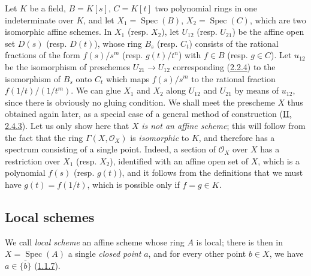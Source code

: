 \begin{example}[2.3.2]
\label{I.2.3.2}
Let $K$ be a field, $B=K[s]$, $C=K[t]$ two polynomial rings in one
indeterminate over $K$, and let $X_1=\operatorname{Spec}(B)$,
$X_2=\operatorname{Spec}(C)$, which are two isomorphic affine schemes. In
$X_1$ (resp. $X_2$), let $U_{12}$ (resp. $U_{21}$) be the affine open set
$D(s)$ (resp. $D(t)$), whose ring $B_s$ (resp. $C_t$) consists of the
rational fractions of the form $f(s)/s^m$ (resp. $g(t)/t^n$) with $f\in B$
(resp. $g\in C$). Let $u_{12}$ be the isomorphism of preschemes
$U_{21}\to U_{12}$ corresponding (\hyperref[I.2.2.4]{2.2.4}) to
the isomorphism of $B_s$ onto $C_t$ which maps $f(s)/s^m$ to the rational
fraction $f(1/t)/(1/t^m)$. We can glue $X_1$ and $X_2$ along
$U_{12}$ and $U_{21}$ by means of $u_{12}$, since there is obviously no
gluing condition. We shall meet the prescheme $X$ thus obtained again later,
as a special case of a general method of construction
(\hyperref[II.2.4.3]{II, 2.4.3}). Let us only show here that $X$
\emph{is not an affine scheme}; this will follow from the fact that the ring
$\Gamma(X,\mathscr{O}_X)$ is \emph{isomorphic} to $K$, and therefore has a
spectrum consisting of a single point. Indeed, a section of $\mathscr{O}_X$
over $X$ has a restriction over $X_1$ (resp. $X_2$), identified with an
affine open set of $X$, which is a polynomial $f(s)$ (resp. $g(t)$), and it
follows from the definitions that we must have $g(t)=f(1/t)$, which is
possible only if $f=g\in K$.
\end{example}

\subsection{Local schemes}
\label{subsection:I.2.4}

\begin{env}[2.4.1]
\label{I.2.4.1}
We call \emph{local scheme} an affine scheme whose ring $A$ is local;
there is then in $X=\operatorname{Spec}(A)$ a single \emph{closed point}
$a$, and for every other point $b\in X$, we have
$a\in\overline{\{b\}}$ (\hyperref[I.1.1.7]{1.1.7}).
\end{env}


